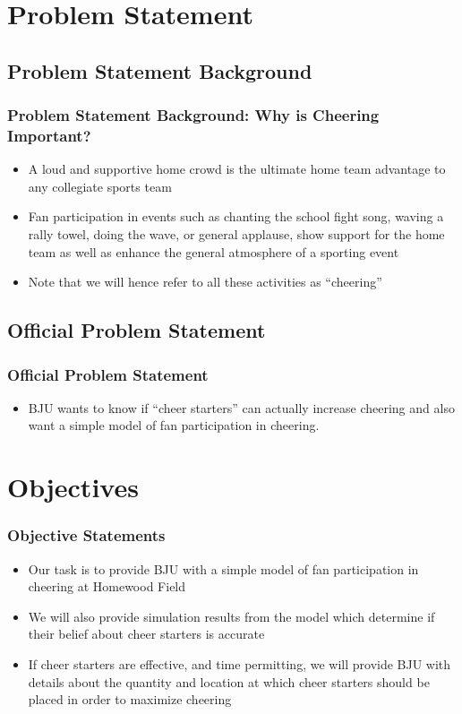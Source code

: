 \documentclass[compress,handout,10pt]{beamer}
\let\olditem\item
\renewcommand{\item}{\setlength{\itemsep}{0.5\baselineskip}\olditem}
\begin{document}
\section{Problem Statement}

\subsection{Problem Statement Background}

\begin{frame}
	\frametitle{Problem Statement Background: Why is Cheering Important?}
	\begin{itemize}
	\item A loud and supportive home crowd is the ultimate home team advantage to any collegiate sports team
	\item Fan participation in events such as chanting the school fight song, waving a rally towel, doing the wave, or general applause, show support for the home team as well as enhance the general atmosphere of a sporting event
	\item Note that we will hence refer to all these activities as ``cheering''
	\end{itemize}
\end{frame}

\subsection{Official Problem Statement}

\begin{frame}
	\frametitle{Official Problem Statement}
		\begin{itemize}
			\item BJU wants to know if ``cheer starters'' can actually increase cheering and also want a simple model of fan participation in cheering.
		\end{itemize}
\end{frame}

\section {Objectives}

\begin{frame}
	\frametitle{Objective Statements}
		\begin{itemize}
			\item Our task is to provide BJU with a simple model of fan participation in cheering at Homewood Field
			\item We will also provide simulation results from the model which determine if their belief about cheer starters is accurate
			\item If cheer starters are effective, and time permitting, we will provide BJU with details about the quantity and location at which cheer starters should be placed in order to maximize cheering
		\end{itemize}
\end{frame}
\end{document}
